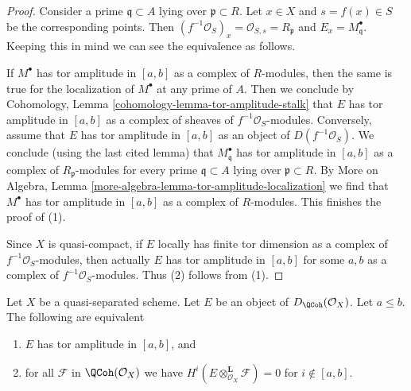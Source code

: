 \begin{proof}
Consider a prime $\mathfrak q \subset A$ lying over $\mathfrak p \subset R$.
Let $x \in X$ and $s = f(x) \in S$ be the corresponding points.
Then $(f^{-1}\mathcal{O}_S)_x = \mathcal{O}_{S, s} = R_\mathfrak p$
and $E_x = M^\bullet_\mathfrak q$. Keeping this in mind we can see
the equivalence as follows.

\medskip\noindent
If $M^\bullet$ has tor amplitude in $[a, b]$ as a complex of $R$-modules,
then the same is true for the localization of $M^\bullet$ at any prime of $A$.
Then we conclude by
Cohomology, Lemma \ref{cohomology-lemma-tor-amplitude-stalk}
that $E$ has tor amplitude in $[a, b]$ as a complex of sheaves
of $f^{-1}\mathcal{O}_S$-modules.
Conversely, assume that $E$ has tor amplitude in $[a, b]$
as an object of $D(f^{-1}\mathcal{O}_S)$.
We conclude (using the last cited lemma) that
$M^\bullet_\mathfrak q$ has tor amplitude in $[a, b]$
as a complex of $R_\mathfrak p$-modules for every
prime $\mathfrak q \subset A$ lying over $\mathfrak p \subset R$.
By More on Algebra, Lemma \ref{more-algebra-lemma-tor-amplitude-localization}
we find that $M^\bullet$ has tor amplitude in $[a, b]$
as a complex of $R$-modules.
This finishes the proof of (1).

\medskip\noindent
Since $X$ is quasi-compact, if $E$ locally has finite tor dimension
as a complex of $f^{-1}\mathcal{O}_S$-modules, then actually $E$
has tor amplitude in $[a, b]$ for some $a, b$ as a complex of
$f^{-1}\mathcal{O}_S$-modules. Thus (2) follows from (1).
\end{proof}

\begin{lemma}
\label{lemma-tor-qc-qs}
Let $X$ be a quasi-separated scheme. Let $E$ be an object
of $D_\QCoh(\mathcal{O}_X)$. Let $a \leq b$. The
following are equivalent
\begin{enumerate}
\item $E$ has tor amplitude in $[a, b]$, and
\item for all $\mathcal{F}$ in $\QCoh(\mathcal{O}_X)$
we have $H^i(E \otimes_{\mathcal{O}_X}^\mathbf{L} \mathcal{F}) = 0$
for $i \not \in [a, b]$.
\end{enumerate}
\end{lemma}

